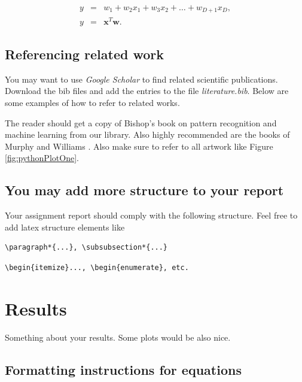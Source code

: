 \documentclass[10pt, a4paper, twocolumn]{article} %
\begin{document}
\begin{eqnarray}\label{eq:linRegModel}
y &=& w_1 + w_2 x_1 + w_3 x_2 + \dots + w_{D+1} x_D, \nonumber \\
y &=&  \bm x^T \bm w.
\end{eqnarray}

\subsection{Referencing related work}

You may want to use \textit{Google Scholar} to find related scientific publications. Download the bib files and add the entries to the file \textit{literature.bib}. Below are some examples of how to refer to related works. 

The reader should get a copy of Bishop's book on pattern recognition and machine learning \citep{bishop2006pattern} from our library. Also highly recommended are the books of Murphy and Williams \etal \citep{murphy2012machine, williams2006gaussian}.  Also make sure to refer to all artwork like Figure \ref{fig:pythonPlotOne}.

\subsection{You may add more structure to your report}

Your assignment report should comply with the following structure. Feel free to add latex structure elements like 
\begin{verbatim}
\paragraph*{...}, \subsubsection*{...} \end{verbatim}
\begin{verbatim}
\begin{itemize}..., \begin{enumerate}, etc. 
\end{verbatim}

\section{Results}
Something about your results. Some plots would be also nice.

\subsection{Formatting instructions for equations} 
\end{document}
